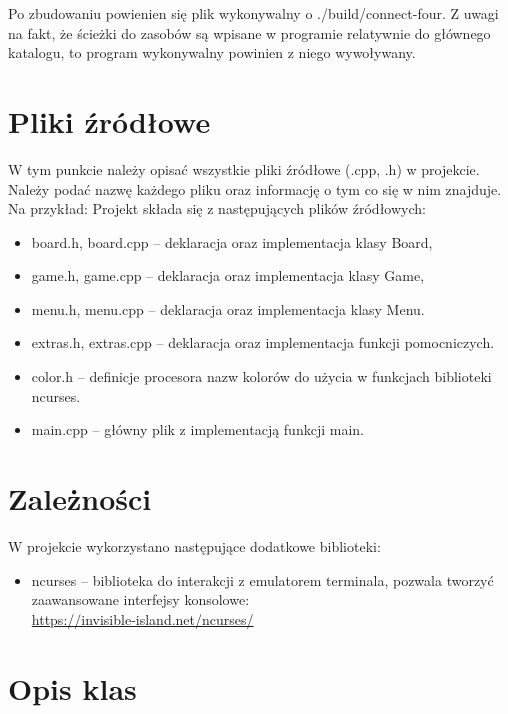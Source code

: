 \documentclass{article}
\begin{document}
Po zbudowaniu powienien się plik wykonywalny o ./build/connect-four. 
Z uwagi na fakt, że ścieżki do zasobów są wpisane w programie relatywnie 
do głównego katalogu, to program wykonywalny powinien z niego wywoływany.

\section{Pliki źródłowe}

W tym punkcie należy opisać wszystkie pliki źródłowe (.cpp, .h) w projekcie. Należy podać nazwę każdego pliku oraz informację o tym co się w nim znajduje. Na przykład:
Projekt składa się z następujących plików źródłowych:
    \begin{itemize}
    \item board.h, board.cpp – deklaracja oraz implementacja klasy Board,
    \item game.h, game.cpp – deklaracja oraz implementacja klasy Game,
    \item menu.h, menu.cpp – deklaracja oraz implementacja klasy Menu.
    \item extras.h, extras.cpp – deklaracja oraz implementacja funkcji pomocniczych.
    \item color.h – definicje procesora nazw kolorów do użycia w funkcjach biblioteki ncurses.
    \item main.cpp – główny plik z implementacją funkcji main.
    \end{itemize}

\section{Zależności}

W projekcie wykorzystano następujące dodatkowe biblioteki:
    \begin{itemize}
    \item ncurses – biblioteka do interakcji z emulatorem terminala,  
    pozwala  tworzyć zaawansowane interfejsy konsolowe:\\
    \url{https://invisible-island.net/ncurses/}
    \end{itemize}
\section{Opis klas}
\end{document}
